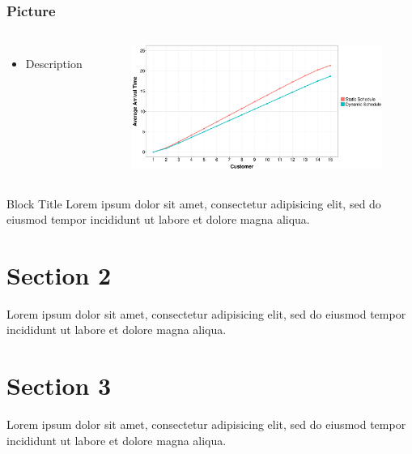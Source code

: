 \documentclass{beamer}
\begin{document}
\begin{frame}
	\frametitle{Picture}
	\begin{columns}
		\begin{itemize}
			\item<2-> Description
		\end{itemize}
		\begin{figure}
			\centering
			\includegraphics[width=\textwidth]{AT_Line.eps}
		\end{figure}
	\end{columns}
\end{frame}

\begin{frame}
	\begin{block}{Block Title}
		Lorem ipsum dolor sit amet, consectetur adipisicing elit, sed do eiusmod tempor incididunt ut labore et dolore magna aliqua.
	\end{block}
\end{frame}

\section{Section 2}

\begin{frame}
	Lorem ipsum dolor sit amet, consectetur adipisicing elit, sed do eiusmod tempor incididunt ut labore et dolore magna aliqua.
\end{frame}

\appendix

\section{Section 3}

\begin{frame}
	Lorem ipsum dolor sit amet, consectetur adipisicing elit, sed do eiusmod tempor incididunt ut labore et dolore magna aliqua.
\end{frame}
\end{document}
